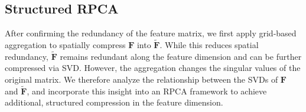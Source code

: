 \documentclass{article}
\begin{document}
\subsection{Structured RPCA}
After confirming the redundancy of the feature matrix, we first apply grid‑based aggregation to spatially compress $\mathbf{F}$ into $\tilde{\mathbf{F}}$. While this reduces spatial redundancy, $\tilde{\mathbf{F}}$ remains redundant along the feature dimension and can be further compressed via SVD. However, the aggregation changes the singular values of the original matrix. We therefore analyze the relationship between the SVDs of $\mathbf{F}$ and $\tilde{\mathbf{F}}$, and incorporate this insight into an RPCA framework to achieve additional, structured compression in the feature dimension.
\end{document}
